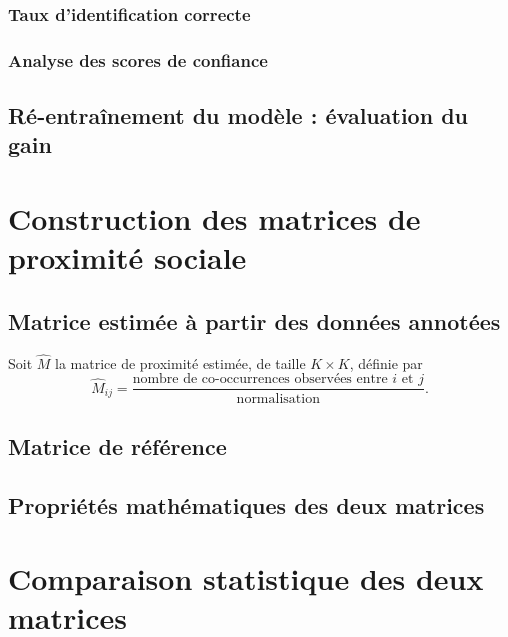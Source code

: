 \documentclass[11pt,a4paper]{report}
\begin{document}
\subsection{Taux d'identification correcte}

\subsection{Analyse des scores de confiance}

\section{Ré-entraînement du modèle : évaluation du gain}


\chapter{Construction des matrices de proximité sociale}

\section{Matrice estimée à partir des données annotées}

Soit $\hat{M}$ la matrice de proximité estimée, de taille $K \times K$, définie par
\begin{equation}
    \hat{M}_{ij} = \frac{\text{nombre de co-occurrences observées entre } i \text{ et } j}{\text{normalisation}}.
\end{equation}

\section{Matrice de référence}

\section{Propriétés mathématiques des deux matrices}


\chapter{Comparaison statistique des deux matrices}
\end{document}
